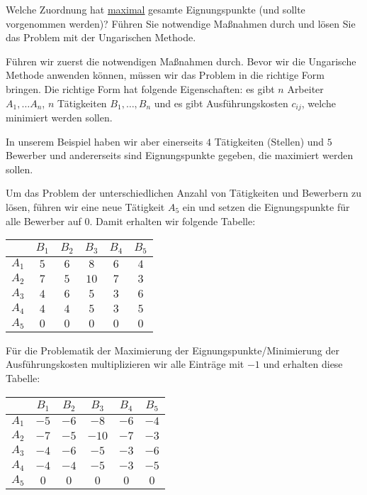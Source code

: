 \documentclass[
a4paper, %
11pt,
]
{scrartcl}
\begin{document}
Welche Zuordnung hat \underline{maximal} gesamte Eignungspunkte (und sollte
vorgenommen werden)? Führen Sie notwendige Maßnahmen durch und lösen Sie das
Problem mit der Ungarischen Methode.

Führen wir zuerst die notwendigen Maßnahmen durch. Bevor wir die Ungarische
Methode anwenden können, müssen wir das Problem in die richtige Form bringen.
Die richtige Form hat folgende Eigenschaften: es gibt $n$ Arbeiter $A_1, \ldots
A_n$, $n$ Tätigkeiten $B_1, \ldots, B_n$ und es gibt Ausführungskosten $c_{ij}$,
welche minimiert werden sollen.

In unserem Beispiel haben wir aber einerseits $4$ Tätigkeiten (Stellen) und $5$
Bewerber und andererseits sind Eignungspunkte gegeben, die maximiert werden
sollen.

Um das Problem der unterschiedlichen Anzahl von Tätigkeiten und Bewerbern zu
lösen, führen wir eine neue Tätigkeit $A_5$ ein und setzen die Eignungspunkte
für alle Bewerber auf $0$. Damit erhalten wir folgende Tabelle:

\begin{center}
  \begin{tabular}{c|ccccc}
           & $B_1$ & $B_2$ & $B_3$ & $B_4$ & $B_5$\\
    \midrule
    $A_1$  & $5$   & $6$   & $8$   & $6$   & $4$\\
    $A_2$  & $7$   & $5$   & $10$  & $7$   & $3$\\
    $A_3$  & $4$   & $6$   & $5$   & $3$   & $6$\\
    $A_4$  & $4$   & $4$   & $5$   & $3$   & $5$\\
    $A_5$  & $0$   & $0$   & $0$   & $0$   & $0$\\
  \end{tabular}
\end{center}

Für die Problematik der Maximierung der Eignungspunkte/Minimierung der
Ausführungskosten multiplizieren wir alle Einträge mit $-1$ und erhalten diese
Tabelle:

\begin{center}
  \begin{tabular}{c|ccccc}
            & $B_1$ & $B_2$ & $B_3$ & $B_4$ & $B_5$\\
    \midrule
    $A_1$   & $-5$  & $-6$  & $-8$  & $-6$  & $-4$\\
    $A_2$   & $-7$  & $-5$  & $-10$ & $-7$  & $-3$\\
    $A_3$   & $-4$  & $-6$  & $-5$  & $-3$  & $-6$\\
    $A_4$   & $-4$  & $-4$  & $-5$  & $-3$  & $-5$\\
    $A_5$   & $0$   & $0$   & $0$   & $0$   & $0$\\
  \end{tabular}
\end{center}
\end{document}

